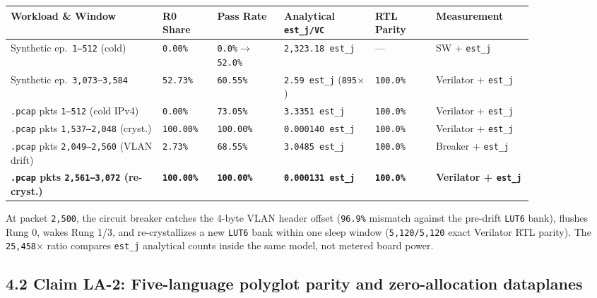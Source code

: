 \documentclass[10pt]{article}
\begin{document}
{\footnotesize\setlength{\tabcolsep}{4pt}
\begin{longtable}{@{}L{0.25\linewidth}C{0.09\linewidth}C{0.11\linewidth}C{0.15\linewidth}C{0.10\linewidth}L{0.16\linewidth}@{}}
\toprule
\textbf{Workload \& Window} & \textbf{R0 Share} & \textbf{Pass Rate} & \textbf{Analytical \texttt{est\_j/VC}} & \textbf{RTL Parity} & \textbf{Measurement} \\
\midrule
\endhead
Synthetic ep.\ \texttt{1--512} (cold) & \texttt{0.00\%} & \texttt{0.0\%$\to$52.0\%} & \texttt{2,323.18 est\_j} & --- & SW + \texttt{est\_j} \\
Synthetic ep.\ \texttt{3,073--3,584} & \texttt{52.73\%} & \texttt{60.55\%} & \texttt{2.59 est\_j} (\texttt{895$\times$}) & \texttt{100.0\%} & Verilator + \texttt{est\_j} \\
\texttt{.pcap} pkts \texttt{1--512} (cold IPv4) & \texttt{0.00\%} & \texttt{73.05\%} & \texttt{3.3351 est\_j} & \texttt{100.0\%} & Verilator + \texttt{est\_j} \\
\texttt{.pcap} pkts \texttt{1,537--2,048} (cryst.) & \texttt{100.00\%} & \texttt{100.00\%} & \texttt{0.000140 est\_j} & \texttt{100.0\%} & Verilator + \texttt{est\_j} \\
\texttt{.pcap} pkts \texttt{2,049--2,560} (VLAN drift) & \texttt{2.73\%} & \texttt{68.55\%} & \texttt{3.0485 est\_j} & \texttt{100.0\%} & Breaker + \texttt{est\_j} \\
\textbf{\texttt{.pcap} pkts \texttt{2,561--3,072} (re-cryst.)} & \textbf{\texttt{100.00\%}} & \textbf{\texttt{100.00\%}} & \textbf{\texttt{0.000131 est\_j}} & \textbf{\texttt{100.0\%}} & \textbf{Verilator + \texttt{est\_j}} \\
\bottomrule
\end{longtable}
}

At packet \texttt{2,500}, the circuit breaker catches the 4-byte VLAN header offset (\texttt{96.9\%} mismatch against the pre-drift \texttt{LUT6} bank), flushes Rung 0, wakes Rung 1/3, and re-crystallizes a new \texttt{LUT6} bank within one sleep window (\texttt{5,120/5,120} exact Verilator RTL parity). The \texttt{25,458$\times$} ratio compares \texttt{est\_j} analytical counts inside the same model, not metered board power.

\subsection{4.2 Claim LA-2: Five-language polyglot parity and zero-allocation dataplanes}\label{claim-la2}
\end{document}
